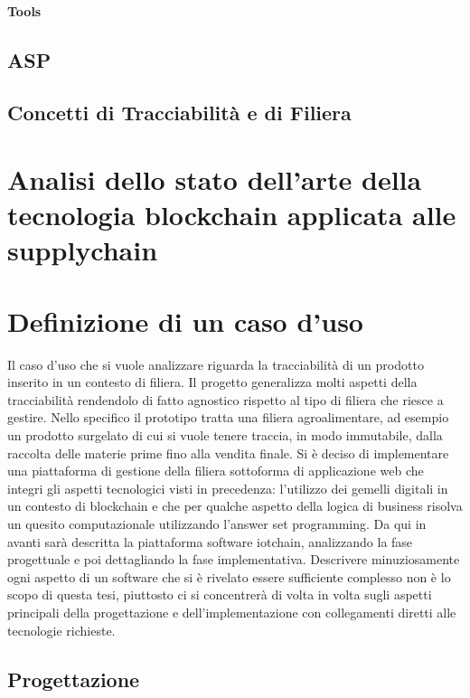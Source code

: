 \documentclass[a4paper,11pt]{article}
\begin{document}

\paragraph{Tools}
\subsection{ASP}

\subsection{Concetti di Tracciabilità e di Filiera}
\section{Analisi dello stato dell’arte della tecnologia blockchain applicata alle supplychain}
\section{Definizione di un caso d’uso}
Il caso d'uso che si vuole analizzare riguarda la tracciabilità di un prodotto inserito in un contesto di filiera. Il progetto generalizza molti aspetti della tracciabilità rendendolo di fatto agnostico rispetto al tipo di filiera che riesce a gestire. Nello specifico il prototipo tratta una filiera agroalimentare, ad esempio un prodotto surgelato di cui si vuole tenere traccia, in modo immutabile, dalla raccolta delle materie prime fino alla vendita finale. Si è deciso di implementare una piattaforma di gestione della filiera sottoforma di applicazione web che integri gli aspetti tecnologici visti in precedenza: l'utilizzo dei gemelli digitali in un contesto di blockchain e che per qualche aspetto della logica di business risolva un quesito computazionale utilizzando l'answer set programming. Da qui in avanti sarà descritta la piattaforma software iotchain, analizzando la fase progettuale e poi dettagliando la fase implementativa. Descrivere minuziosamente ogni aspetto di un software che si è rivelato essere sufficiente complesso non è lo scopo di questa tesi, piuttosto ci si concentrerà di volta in volta sugli aspetti principali della progettazione e dell'implementazione con collegamenti diretti alle tecnologie richieste.

\subsection{Progettazione}
\end{document}
